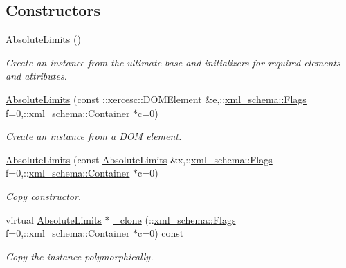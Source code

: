 \subsection*{Constructors}
\begin{DoxyCompactItemize}
\item 
\hypertarget{classopenstack_1_1xml_1_1AbsoluteLimits_abede2f5d82113c899fc8b21887150e73}{
\hyperlink{classopenstack_1_1xml_1_1AbsoluteLimits_abede2f5d82113c899fc8b21887150e73}{AbsoluteLimits} ()}
\label{classopenstack_1_1xml_1_1AbsoluteLimits_abede2f5d82113c899fc8b21887150e73}

\begin{DoxyCompactList}\small\item\em Create an instance from the ultimate base and initializers for required elements and attributes. \item\end{DoxyCompactList}\item 
\hyperlink{classopenstack_1_1xml_1_1AbsoluteLimits_ad309ecd478712817061b246dd872db21}{AbsoluteLimits} (const ::xercesc::DOMElement \&e,::\hyperlink{namespacexml__schema_affb4c227cbd9aa7453dd1dc5a1401943}{xml\_\-schema::Flags} f=0,::\hyperlink{namespacexml__schema_a333dea2213742aea47a37532dec4ec27}{xml\_\-schema::Container} $\ast$c=0)
\begin{DoxyCompactList}\small\item\em Create an instance from a DOM element. \item\end{DoxyCompactList}\item 
\hyperlink{classopenstack_1_1xml_1_1AbsoluteLimits_a785b943ef9d91d8f269bda7284d1cff2}{AbsoluteLimits} (const \hyperlink{classopenstack_1_1xml_1_1AbsoluteLimits}{AbsoluteLimits} \&x,::\hyperlink{namespacexml__schema_affb4c227cbd9aa7453dd1dc5a1401943}{xml\_\-schema::Flags} f=0,::\hyperlink{namespacexml__schema_a333dea2213742aea47a37532dec4ec27}{xml\_\-schema::Container} $\ast$c=0)
\begin{DoxyCompactList}\small\item\em Copy constructor. \item\end{DoxyCompactList}\item 
virtual \hyperlink{classopenstack_1_1xml_1_1AbsoluteLimits}{AbsoluteLimits} $\ast$ \hyperlink{classopenstack_1_1xml_1_1AbsoluteLimits_a8846a2b59e59388f25ce397a4595b8af}{\_\-clone} (::\hyperlink{namespacexml__schema_affb4c227cbd9aa7453dd1dc5a1401943}{xml\_\-schema::Flags} f=0,::\hyperlink{namespacexml__schema_a333dea2213742aea47a37532dec4ec27}{xml\_\-schema::Container} $\ast$c=0) const 
\begin{DoxyCompactList}\small\item\em Copy the instance polymorphically. \item\end{DoxyCompactList}\end{DoxyCompactItemize}


